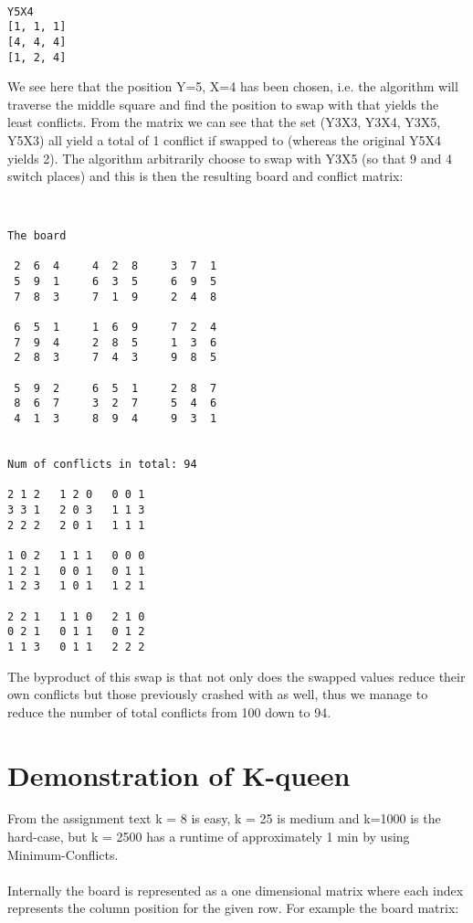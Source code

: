 \documentclass[12pt, a4paper]{article}
\begin{document}
\begin{verbatim}

Y5X4
[1, 1, 1]
[4, 4, 4]
[1, 2, 4]

\end{verbatim}
\noindent
We see here that the position Y=5, X=4 has been chosen, i.e. the algorithm will traverse the middle square and find the position to swap with that yields the least conflicts.
From the matrix we can see that the set (Y3X3, Y3X4, Y3X5, Y5X3) all yield a total of 1 conflict if swapped to (whereas the original Y5X4 yields 2). The algorithm arbitrarily choose to swap with Y3X5 (so that 9 and 4 switch places) and this is then the resulting board and conflict matrix:

\begin{verbatim}


The board

 2  6  4     4  2  8     3  7  1 
 5  9  1     6  3  5     6  9  5 
 7  8  3     7  1  9     2  4  8 

 6  5  1     1  6  9     7  2  4 
 7  9  4     2  8  5     1  3  6 
 2  8  3     7  4  3     9  8  5 

 5  9  2     6  5  1     2  8  7 
 8  6  7     3  2  7     5  4  6 
 4  1  3     8  9  4     9  3  1 


Num of conflicts in total: 94

2 1 2 	1 2 0 	0 0 1 
3 3 1 	2 0 3 	1 1 3 
2 2 2 	2 0 1 	1 1 1 

1 0 2 	1 1 1 	0 0 0 
1 2 1 	0 0 1 	0 1 1 
1 2 3 	1 0 1 	1 2 1 

2 2 1 	1 1 0 	2 1 0 
0 2 1 	0 1 1 	0 1 2 
1 1 3 	0 1 1 	2 2 2 

\end{verbatim}

\noindent 
The byproduct of this swap is that not only does the swapped values reduce their own conflicts but those previously crashed with as well, thus we manage to reduce the number of total conflicts from 100 down to 94.

\section{Demonstration of K-queen}
From the assignment text k = 8 is easy, k = 25 is medium and k=1000 is the hard-case, but k = 2500 has a runtime of approximately 1 min by using Minimum-Conflicts.
\\\\
Internally the board is represented as a one dimensional matrix where each index represents the column position for the given row. For example the board matrix:
\end{document}
